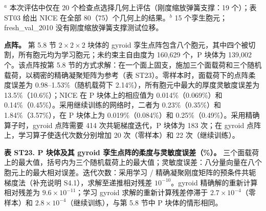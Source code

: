 \documentclass[preprint,12pt,authoryear]{elsarticle}
\begin{document}
\(^{a}\) 本次评估中仅在 20 个检查点选择几何上评估（刚度缩放弹簧支撑：19 个）；表 ST03 给出 NICE 在全部 80（75）个几何上的结果。\(^{b}\) 15 个孪生胞元；fresh\_val\_2010 没有刚度缩放弹簧支撑测试位移。

\textbf{点阵。} 第 5.8 节 \(2\times2\times2\) 块体的 gyroid 孪生点阵包含八个胞元，其中四个被切割，所有胞元均为学习胞元；未约束主自由度为 160,629 个，P 块体为 139,002 个。该点阵按第 5.8 节的方式求解：在一个面上固支，施加三个面载荷和三个随机载荷，以稠密的精确凝聚矩阵为参考（表 ST23）。零样本时，面载荷下的点阵柔度误差为 0.98--1.53\%（随机载荷下 2.14\%），所有胞元中最大的厚度灵敏度误差为 13.5\%（10.6\%）；NICE 在 P 块体上的相应值为 0.014\%（0.069\%）和 0.14\%（0.45\%）。采用继续训练的网络时，二者为 0.23\%（0.35\%）和 1.84\%（3.57\%），在 P 块体上为 0.019\%（0.084\%）和 0.25\%（0.49\%）。采用精确算子时，gyroid 点阵需要 414 次共轭梯度迭代，P 块体为 183 次；在 gyroid 点阵上，学习算子使迭代次数分别增加 20 次（零样本）和 22 次（继续训练）。

\textbf{表 ST23. P 块体及其 gyroid 孪生点阵的柔度与灵敏度误差（\%）。} 三个面载荷上的最大值，括号内为三个随机载荷上的最大值；灵敏度误差：八分量向量在八个胞元上的最大相对误差。迭代次数：采用学习 / 精确凝聚刚度矩阵的预条件共轭梯度法（补充说明 S4.1），求解至递推相对残差 \(10^{-10}\)。gyroid 精确解的重新计算相对残差为 \(9.6\times10^{-11}\)；学习 gyroid 求解的重新计算残差停滞于 \(2.7\times10^{-4}\)（零样本）和 \(2.8\times10^{-4}\)（继续训练），与第 5.8 节中 P 块体的情形相同。
\end{document}
